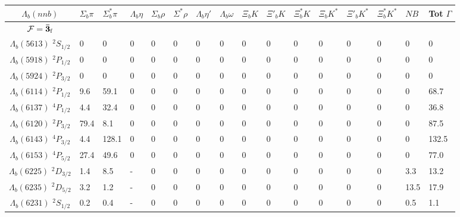 \begin{tabular}{c |  p{0.58cm}  p{0.58cm}  p{0.58cm}  p{0.58cm}  p{0.58cm}  p{0.58cm}  p{0.58cm}  p{0.58cm}  p{0.58cm}  p{0.58cm}  p{0.58cm}  p{0.58cm}  p{0.58cm}  p{0.58cm}p{0.75cm}} \hline \hline
$\Lambda_b(nnb)$  & $\Sigma_{b} \pi$  & $\Sigma^{*}_{b} \pi$  & $\Lambda_{b} \eta$  & $\Sigma_{b}\rho$  & $\Sigma^{*}\rho$  & $\Lambda_{b}\eta'$  & $\Lambda_{b}\omega$  & $\Xi_{b} K$  & $\Xi'_{b} K$  & $\Xi^{*}_{b} K$  & $\Xi_{b} K^{*}$  & $\Xi'_{b} K^{*}$  & $\Xi^{*}_{b} K^{*}$  & $N B$  & Tot $\Gamma$  \\ \hline
$\mathcal{F}={\bf {\bar{3}}}_{\rm f}$&&&&&&&&&&&&&&\\ \hline
$\Lambda_b(5613)$ $^{2}S_{1/2}$&$0$   &$0$   &$0$   &$0$   &$0$   &$0$   &$0$   &$0$   &$0$   &$0$   &$0$   &$0$   &$0$   &$0$   &$0$  \\
$\Lambda_b(5918)$ $^{2}P_{1/2}$&$0$   &$0$   &$0$   &$0$   &$0$   &$0$   &$0$   &$0$   &$0$   &$0$   &$0$   &$0$   &$0$   &$0$   &$0$  \\
$\Lambda_b(5924)$ $^{2}P_{3/2}$&$0$   &$0$   &$0$   &$0$   &$0$   &$0$   &$0$   &$0$   &$0$   &$0$   &$0$   &$0$   &$0$   &$0$   &$0$  \\
$\Lambda_b(6114)$ $^{2}P_{1/2}$&9.6   &59.1   &$0$   &$0$   &$0$   &$0$   &$0$   &$0$   &$0$   &$0$   &$0$   &$0$   &$0$   &$0$   &68.7  \\
$\Lambda_b(6137)$ $^{4}P_{1/2}$&4.4   &32.4   &$0$   &$0$   &$0$   &$0$   &$0$   &$0$   &$0$   &$0$   &$0$   &$0$   &$0$   &$0$   &36.8  \\
$\Lambda_b(6120)$ $^{2}P_{3/2}$&79.4   &8.1   &$0$   &$0$   &$0$   &$0$   &$0$   &$0$   &$0$   &$0$   &$0$   &$0$   &$0$   &$0$   &87.5  \\
$\Lambda_b(6143)$ $^{4}P_{3/2}$&4.4   &128.1   &$0$   &$0$   &$0$   &$0$   &$0$   &$0$   &$0$   &$0$   &$0$   &$0$   &$0$   &$0$   &132.5  \\
$\Lambda_b(6153)$ $^{4}P_{5/2}$&27.4   &49.6   &$0$   &$0$   &$0$   &$0$   &$0$   &$0$   &$0$   &$0$   &$0$   &$0$   &$0$   &$0$   &77.0  \\
$\Lambda_b(6225)$ $^{2}D_{3/2}$&1.4   &8.5   &-   &$0$   &$0$   &$0$   &$0$   &$0$   &$0$   &$0$   &$0$   &$0$   &$0$   &3.3   &13.2  \\
$\Lambda_b(6235)$ $^{2}D_{5/2}$&3.2   &1.2   &-   &$0$   &$0$   &$0$   &$0$   &$0$   &$0$   &$0$   &$0$   &$0$   &$0$   &13.5   &17.9  \\
$\Lambda_b(6231)$ $^{2}S_{1/2}$&0.2   &0.4   &-   &$0$   &$0$   &$0$   &$0$   &$0$   &$0$   &$0$   &$0$   &$0$   &$0$   &0.5   &1.1  \\

\end{tabular}
